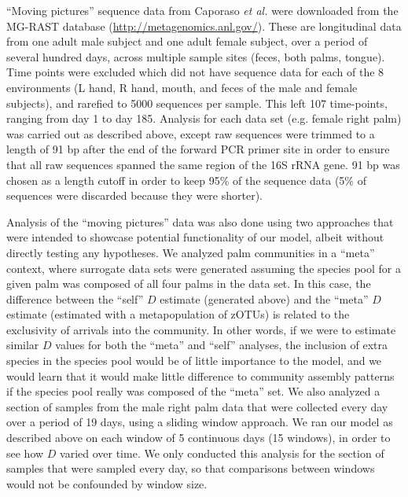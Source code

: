 \documentclass{article}
\begin{document}
\par
“Moving pictures” sequence data from Caporaso \emph{et al.} \cite{Caporaso2011} were downloaded from the MG-RAST database (\url{http://metagenomics.anl.gov/}). These are longitudinal data from one adult male subject and one adult female subject, over a period of several hundred days, across multiple sample sites (feces, both palms, tongue). Time points were excluded which did not have sequence data for each of the 8 environments (L hand, R hand, mouth, and feces of the male and female subjects), and rarefied to 5000 sequences per sample. This left 107 time-points, ranging from day 1 to day 185. Analysis for each data set (e.g. female right palm) was carried out as described above, except raw sequences were trimmed to a length of 91 bp after the end of the forward PCR primer site in order to ensure that all raw sequences spanned the same region of the 16S rRNA gene. 91 bp was chosen as a length cutoff in order to keep 95\% of the sequence data (5\% of sequences were discarded because they were shorter).
\par
Analysis of the “moving pictures” data was also done using two approaches that were intended to showcase potential functionality of our model, albeit without directly testing any hypotheses. We analyzed palm communities in a “meta” context, where surrogate data sets were generated assuming the species pool for a given palm was composed of all four palms in the data set. In this case, the difference between the “self” \(D\) estimate (generated above) and the “meta” \(D\) estimate (estimated with a metapopulation of zOTUs) is related to the exclusivity of arrivals into the community. In other words, if we were to estimate similar \(D\) values for both the “meta” and “self” analyses, the inclusion of extra species in the species pool would be of little importance to the model, and we would learn that it would make little difference to community assembly patterns if the species pool really was composed of the “meta” set. We also analyzed a section of samples from the male right palm data that were collected every day over a period of 19 days, using a sliding window approach. We ran our model as described above on each window of 5 continuous days (15 windows), in order to see how \(D\) varied over time. We only conducted this analysis for the section of samples that were sampled every day, so that comparisons between windows would not be confounded by window size.
\par
\end{document}
